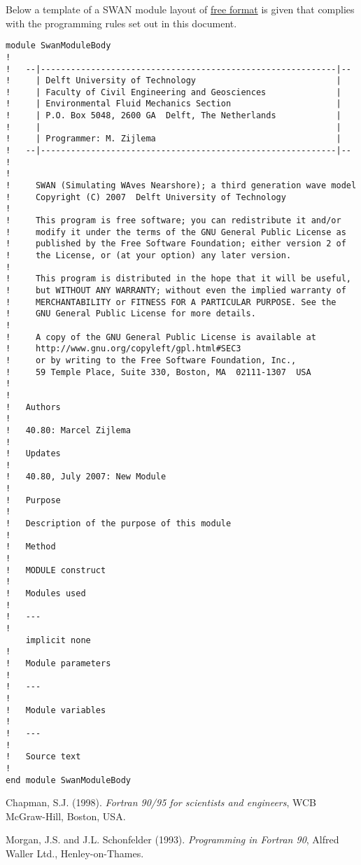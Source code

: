 \documentclass[12pt]{book}
\begin{document}
\newpage
\noindent
Below a template of a SWAN module layout of \underline{free format} is given that complies with the programming rules set out in this document.
\\[2ex]
\begin{verbatim}
module SwanModuleBody
!
!   --|-----------------------------------------------------------|--
!     | Delft University of Technology                            |
!     | Faculty of Civil Engineering and Geosciences              |
!     | Environmental Fluid Mechanics Section                     |
!     | P.O. Box 5048, 2600 GA  Delft, The Netherlands            |
!     |                                                           |
!     | Programmer: M. Zijlema                                    |
!   --|-----------------------------------------------------------|--
!
!
!     SWAN (Simulating WAves Nearshore); a third generation wave model
!     Copyright (C) 2007  Delft University of Technology
!
!     This program is free software; you can redistribute it and/or
!     modify it under the terms of the GNU General Public License as
!     published by the Free Software Foundation; either version 2 of
!     the License, or (at your option) any later version.
!
!     This program is distributed in the hope that it will be useful,
!     but WITHOUT ANY WARRANTY; without even the implied warranty of
!     MERCHANTABILITY or FITNESS FOR A PARTICULAR PURPOSE. See the
!     GNU General Public License for more details.
!
!     A copy of the GNU General Public License is available at
!     http://www.gnu.org/copyleft/gpl.html#SEC3
!     or by writing to the Free Software Foundation, Inc.,
!     59 Temple Place, Suite 330, Boston, MA  02111-1307  USA
!
!
!   Authors
!
!   40.80: Marcel Zijlema
!
!   Updates
!
!   40.80, July 2007: New Module
!
!   Purpose
!
!   Description of the purpose of this module
!
!   Method
!
!   MODULE construct
!
!   Modules used
!
!   ---
!
    implicit none
!
!   Module parameters
!
!   ---
!
!   Module variables
!
!   ---
!
!   Source text
!
end module SwanModuleBody
\end{verbatim}

\newpage
\markboth{}{}
\begin{thebibliography}{10}

Chapman, S.J. (1998). {\it Fortran 90/95 for scientists and engineers}, WCB McGraw-Hill, Boston, USA.

Morgan, J.S. and J.L. Schonfelder (1993). {\it Programming in Fortran 90}, Alfred Waller Ltd.,
Henley-on-Thames.

\end{thebibliography}
\end{document}
